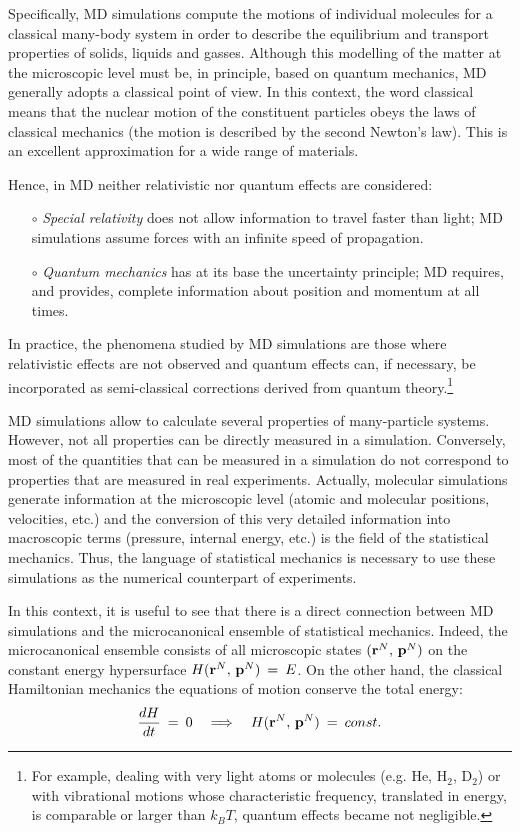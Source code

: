 Specifically, MD simulations compute the motions of individual molecules for a classical many-body system in order to describe the equilibrium and transport properties of solids, liquids and gasses.
Although this modelling of the matter at the microscopic level must be, in principle, based on quantum mechanics, MD generally adopts a classical point of view.
In this context, the word classical means that the nuclear motion of the constituent particles obeys the laws of classical mechanics (the motion is described by the second Newton's law).
This is an excellent approximation for a wide range of materials.

Hence, in MD neither relativistic nor quantum effects are considered:
\begin{itemize}
\item[$\circ$] \textit{Special relativity} does not allow information to travel faster than light; MD simulations assume forces with an infinite speed of propagation.
\item[$\circ$] \textit{Quantum mechanics} has at its base the uncertainty principle; MD requires, and provides, complete information about position and momentum at all times.
\end{itemize}

In practice, the phenomena studied by MD simulations are those where relativistic effects are not observed and quantum effects can, if necessary, be incorporated as semi-classical corrections derived from quantum theory.\footnote{For example, dealing with very light atoms or molecules (e.g. He, H$_2$, D$_2$) or with vibrational motions whose characteristic frequency, translated in energy, is comparable or larger than $k_B T$, quantum effects became not negligible.}

MD simulations allow to calculate several properties of many-particle systems. However, not all properties can be directly measured in a simulation. Conversely, most of the quantities that can be measured in a simulation do not correspond to properties that are measured in real experiments.
Actually, molecular simulations generate information at the microscopic level (atomic and molecular positions, velocities, etc.) and the conversion of this very detailed information into macroscopic terms (pressure, internal energy, etc.) is the field of the statistical mechanics. Thus, the language of statistical mechanics is necessary to use these simulations as the numerical counterpart of experiments.

In this context, it is useful to see that there is a direct connection between MD simulations and the microcanonical ensemble of statistical mechanics. Indeed, the microcanonical ensemble consists of all microscopic states $( \bold{r}^N, \, \bold{p}^N )$  on the constant energy hypersurface $H (\bold{r}^N , \, \bold{p}^N) \:=\: E$.
On the other hand, the classical Hamiltonian mechanics the equations of motion conserve the total energy: 
\begin{equation}
\frac{dH}{dt} \:=\: 0 \quad \Longrightarrow \quad H ( \bold{r}^N, \, \bold{p}^N ) \:=\: const.
\end{equation}

